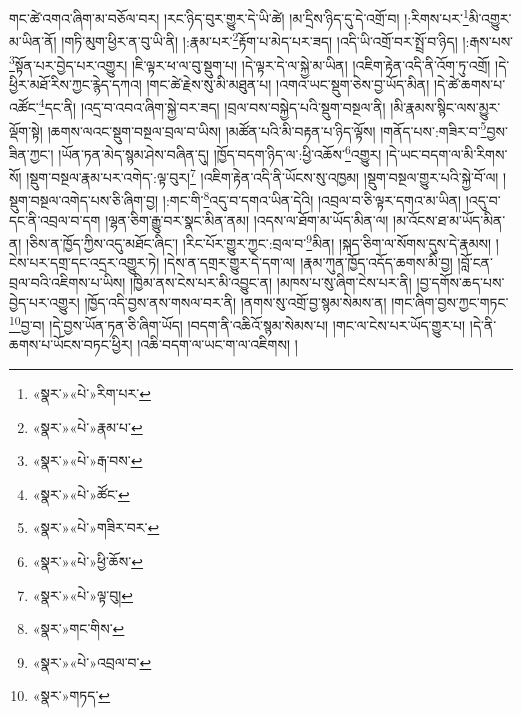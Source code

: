 གང་ཚེ་འགའ་ཞིག་མ་བཅོལ་བར། །རང་ཉིད་བུར་གྱུར་དེ་ཡི་ཚེ། །མ་དྲིས་ཉིད་དུ་དེ་འགྲོ་བ། །:རིགས་པར་\footnote{«སྣར་»«པེ་»རིག་པར་}མི་འགྱུར་མ་ཡིན་ནོ། །གཏི་མུག་ཕྱིར་ན་བུ་ཡི་ནི། །:རྣམ་པར་\footnote{«སྣར་»«པེ་»རྣམ་པ་}རྟོག་པ་མེད་པར་ཟད། །འདི་ཡི་འགྲོ་བར་སྤྲོ་བ་ཉིད། །:རྒས་པས་\footnote{«སྣར་»«པེ་»རྒ་བས་}སྟོན་པར་བྱེད་པར་འགྱུར། །ཇི་ལྟར་ཕ་ལ་བུ་སྡུག་པ། །དེ་ལྟར་དེ་ལ་སྐྱེ་མ་ཡིན། །འཇིག་རྟེན་འདི་ནི་འོག་ཏུ་འགྲོ། །དེ་ཕྱིར་མཐོ་རིས་ཀྱང་རྙེད་དཀའ། །གང་ཚེ་རྗེས་སུ་མི་མཐུན་པ། །འགའ་ཡང་སྡུག་ཅེས་བྱ་ཡོད་མིན། །དེ་ཚེ་ཆགས་པ་འཚོང་\footnote{«སྣར་»«པེ་»ཚོང་}དང་ནི། །འདྲ་བ་འབའ་ཞིག་སྐྱེ་བར་ཟད། །བྲལ་བས་བསྐྱེད་པའི་སྡུག་བསྔལ་ནི། །མི་རྣམས་སྙིང་ལས་མྱུར་ལྡོག་སྟེ། །ཆགས་ལའང་སྡུག་བསྔལ་བྲལ་བ་ཡིས། །མཚོན་པའི་མི་བརྟན་པ་ཉིད་ལྟོས། །གནོད་པས་:གཟིར་བ་\footnote{«སྣར་»«པེ་»གཟིར་བར་}བྱས་ཟིན་ཀྱང་། །ཡོན་ཏན་མེད་སྙམ་ཤེས་བཞིན་དུ། །ཁྱོད་བདག་ཉིད་ལ་:ཕྱི་འཆོས་\footnote{«སྣར་»«པེ་»ཕྱི་ཆོས་}འགྱུར། །དེ་ཡང་བདག་ལ་མི་རིགས་སོ། །སྡུག་བསྔལ་རྣམ་པར་འགེད་:ལྟ་བུར།\footnote{«སྣར་»«པེ་»ལྟ་བུ།} །འཇིག་རྟེན་འདི་ནི་ཡོངས་སུ་འཁྱམ། །སྡུག་བསྔལ་གྱུར་པའི་སྐྱེ་བོ་ལ། །སྡུག་བསྔལ་འགེད་པས་ཅི་ཞིག་བྱ། །:གང་གི་\footnote{«སྣར་»གང་གིས་}འདུ་བ་དགའ་ཡིན་དེའི། །འབྲལ་བ་ཅི་ལྟར་དགའ་མ་ཡིན། །འདུ་བ་དང་ནི་འབྲལ་བ་དག །ལྷན་ཅིག་རྒྱུ་བར་སྣང་མིན་ནམ། །འདས་ལ་ཐོག་མ་ཡོད་མིན་ལ། །མ་འོངས་ཐ་མ་ཡོད་མིན་ན། །ཅིས་ན་ཁྱོད་ཀྱིས་འདུ་མཐོང་ཞིང་། །རིང་པོར་གྱུར་ཀྱང་:བྲལ་བ་\footnote{«སྣར་»«པེ་»འབྲལ་བ་}མིན། །སྐད་ཅིག་ལ་སོགས་དུས་དེ་རྣམས། །ངེས་པར་དགྲ་དང་འདྲར་འགྱུར་ཏེ། །དེས་ན་དགྲར་གྱུར་དེ་དག་ལ། །རྣམ་ཀུན་ཁྱོད་འདོད་ཆགས་མི་བྱ། །བློ་ངན་བྲལ་བའི་འཇིགས་པ་ཡིས། །ཁྱིམ་ནས་ངེས་པར་མི་འབྱུང་ན། །མཁས་པ་སུ་ཞིག་ངེས་པར་ནི། །བྱ་དགོས་ཆད་པས་བྱེད་པར་འགྱུར། །ཁྱོད་འདི་བྱས་ནས་གསལ་བར་ནི། །ནགས་སུ་འགྲོ་བྱ་སྙམ་སེམས་ན། །གང་ཞིག་བྱས་ཀྱང་གཏང་\footnote{«སྣར་»གཏད་}བྱ་བ། །དེ་བྱས་ཡོན་ཏན་ཅི་ཞིག་ཡོད། །བདག་ནི་འཆིའོ་སྙམ་སེམས་པ། །གང་ལ་ངེས་པར་ཡོད་གྱུར་པ། །དེ་ནི་ཆགས་པ་ཡོངས་བཏང་ཕྱིར། །འཆི་བདག་ལ་ཡང་ག་ལ་འཇིགས། །
